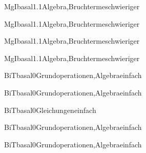 \documentclass[12pt]{article}
\begin{document}
\begin{Add}{MgI}{basal1.1}{Algebra,Bruchterme}{schwieriger}
\end{Add}

\begin{Add}{MgI}{basal1.1}{Algebra,Bruchterme}{schwieriger}
\end{Add}

\begin{Add}{MgI}{basal1.1}{Algebra,Bruchterme}{schwieriger}
\end{Add}

\begin{Add}{MgI}{basal1.1}{Algebra,Bruchterme}{schwieriger}
\end{Add}



\begin{Add}{BiT}{basal0}{Grundoperationen,Algebra}{einfach}
\end{Add}

\begin{Add}{BiT}{basal0}{Grundoperationen,Algebra}{einfach}
\end{Add}

\begin{Add}{BiT}{basal0}{Gleichungen}{einfach}
      
\end{Add}

\begin{Add}{BiT}{basal0}{Grundoperationen,Algebra}{einfach}
      
\end{Add}

\begin{Add}{BiT}{basal0}{Grundoperationen,Algebra}{einfach}
      
\end{Add}
\end{document}
